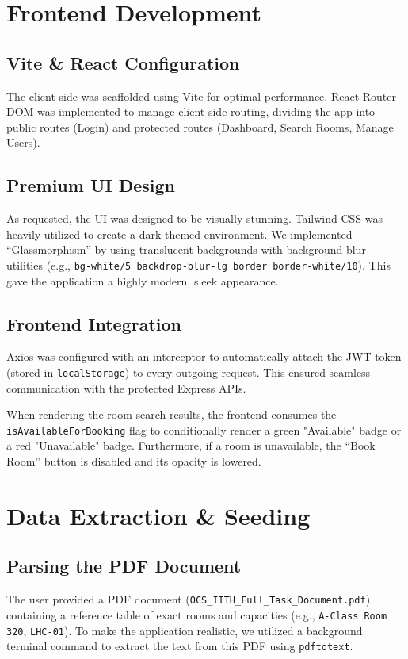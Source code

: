 \documentclass[12pt, a4paper]{report}
\begin{document}
\chapter{Frontend Development}

\section{Vite \& React Configuration}
The client-side was scaffolded using Vite for optimal performance. React Router DOM was implemented to manage client-side routing, dividing the app into public routes (Login) and protected routes (Dashboard, Search Rooms, Manage Users).

\section{Premium UI Design}
As requested, the UI was designed to be visually stunning. Tailwind CSS was heavily utilized to create a dark-themed environment. We implemented ``Glassmorphism'' by using translucent backgrounds with background-blur utilities (e.g., \texttt{bg-white/5 backdrop-blur-lg border border-white/10}). This gave the application a highly modern, sleek appearance.

\section{Frontend Integration}
Axios was configured with an interceptor to automatically attach the JWT token (stored in \texttt{localStorage}) to every outgoing request. This ensured seamless communication with the protected Express APIs.

When rendering the room search results, the frontend consumes the \texttt{isAvailableForBooking} flag to conditionally render a green "Available" badge or a red "Unavailable" badge. Furthermore, if a room is unavailable, the ``Book Room'' button is disabled and its opacity is lowered.

\chapter{Data Extraction \& Seeding}

\section{Parsing the PDF Document}
The user provided a PDF document (\texttt{OCS\_IITH\_Full\_Task\_Document.pdf}) containing a reference table of exact rooms and capacities (e.g., \texttt{A-Class Room 320}, \texttt{LHC-01}). To make the application realistic, we utilized a background terminal command to extract the text from this PDF using \texttt{pdftotext}.
\end{document}
